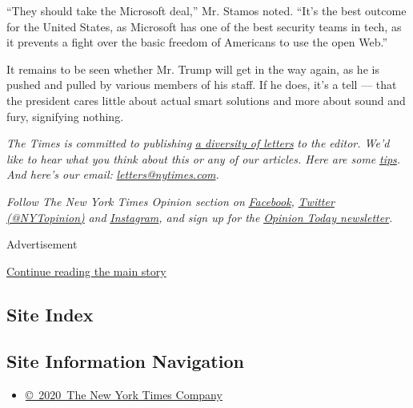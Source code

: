 ``They should take the Microsoft deal,'' Mr. Stamos noted. ``It's the
best outcome for the United States, as Microsoft has one of the best
security teams in tech, as it prevents a fight over the basic freedom of
Americans to use the open Web.''

It remains to be seen whether Mr. Trump will get in the way again, as he
is pushed and pulled by various members of his staff. If he does, it's a
tell --- that the president cares little about actual smart solutions
and more about sound and fury, signifying nothing.

\emph{The Times is committed to publishing}
\href{https://www.nytimes.com/2019/01/31/opinion/letters/letters-to-editor-new-york-times-women.html}{\emph{a
diversity of letters}} \emph{to the editor. We'd like to hear what you
think about this or any of our articles. Here are some}
\href{https://help.nytimes.com/hc/en-us/articles/115014925288-How-to-submit-a-letter-to-the-editor}{\emph{tips}}\emph{.
And here's our email:}
\href{mailto:letters@nytimes.com}{\emph{letters@nytimes.com}}\emph{.}

\emph{Follow The New York Times Opinion section on}
\href{https://www.facebook.com/nytopinion}{\emph{Facebook}}\emph{,}
\href{http://twitter.com/NYTOpinion}{\emph{Twitter (@NYTopinion)}}
\emph{and}
\href{https://www.instagram.com/nytopinion/}{\emph{Instagram}}\emph{,
and sign up for the}
\href{http://www.nytimes.com/newsletters/opiniontoday/}{\emph{Opinion
Today newsletter}}\emph{.}

Advertisement

\protect\hyperlink{after-bottom}{Continue reading the main story}

\hypertarget{site-index}{%
\subsection{Site Index}\label{site-index}}

\hypertarget{site-information-navigation}{%
\subsection{Site Information
Navigation}\label{site-information-navigation}}

\begin{itemize}
\tightlist
\item
  \href{https://help.nytimes.com/hc/en-us/articles/115014792127-Copyright-notice}{©~2020~The
  New York Times Company}
\end{itemize}

